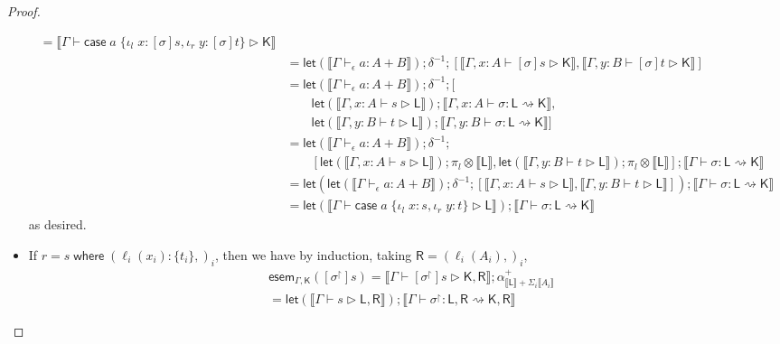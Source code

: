 \documentclass[acmsmall,screen,review]{acmart}
\newcommand{\ms}[1]{\ensuremath{\mathsf{#1}}}
\newcommand{\lto}{:}
\newcommand{\linl}[1]{\iota_l\;{#1}}
\newcommand{\linr}[1]{\iota_r\;{#1}}
\newcommand{\casestmt}[5]{\ms{case}\;#1\;\{\linl{#2} \lto #3, \linr{#4} \lto #5\}}
\newcommand{\where}[2]{#1\;\ms{where}\;#2}
\newcommand{\wbranch}[3]{#1(#2) \lto \{#3\}}
\newcommand{\rupg}[1]{{#1}^\upharpoonright}
\newcommand{\bhyp}[2]{#1 : #2}
\newcommand{\hasty}[4]{#1 \vdash_{#2} #3: {#4}}
\newcommand{\haslb}[3]{#1 \vdash #2 \rhd #3}
\newcommand{\lbsubst}[4]{#1 \vdash #2: #3 \rightsquigarrow #4}
\newcommand{\dnt}[1]{\llbracket{#1}\rrbracket}
\newcommand{\entrymor}[3]{\ms{esem}_{#1, #3}(#2)}
\newcommand{\lmor}[1]{\ms{let}(#1)}
\begin{document}
\begin{proof}
\begin{itemize}[leftmargin=*]
\begin{equation}
\begin{aligned}
          = \dnt{\haslb{\Gamma}{\casestmt{a}{x}{[\sigma]s}{y}{[\sigma]t}}{\ms{K}}} \\
        & = \lmor{\dnt{\hasty{\Gamma}{\epsilon}{a}{A + B}}} ; \delta^{-1}
          ; [\dnt{\haslb{\Gamma, \bhyp{x}{A}}{[\sigma]s}{\ms{K}}}, 
              \dnt{\haslb{\Gamma, \bhyp{y}{B}}{[\sigma]t}{\ms{K}}}] \\
        & = \lmor{\dnt{\hasty{\Gamma}{\epsilon}{a}{A + B}}} ; \delta^{-1} ; [
        \\ & \qquad 
            \lmor{\dnt{\haslb{\Gamma, \bhyp{x}{A}}{s}{\ms{L}}}} 
              ; \dnt{\lbsubst{\Gamma, \bhyp{x}{A}}{\sigma}{\ms{L}}{\ms{K}}},
        \\ & \qquad
            \lmor{\dnt{\haslb{\Gamma, \bhyp{y}{B}}{t}{\ms{L}}}}
              ; \dnt{\lbsubst{\Gamma, \bhyp{y}{B}}{\sigma}{\ms{L}}{\ms{K}}}
          ] \\
        & = \lmor{\dnt{\hasty{\Gamma}{\epsilon}{a}{A + B}}} ; \delta^{-1} ;
        \\ & \qquad [
              \lmor{\dnt{\haslb{\Gamma, \bhyp{x}{A}}{s}{\ms{L}}}} ; \pi_l \otimes \dnt{\ms{L}}, 
              \lmor{\dnt{\haslb{\Gamma, \bhyp{y}{B}}{t}{\ms{L}}}} ; \pi_l \otimes \dnt{\ms{L}}] 
          ; \dnt{\lbsubst{\Gamma}{\sigma}{\ms{L}}{\ms{K}}} \\
        & = \lmor{
            \lmor{\dnt{\hasty{\Gamma}{\epsilon}{a}{A + B}}} 
            ; \delta^{-1} 
            ; [\dnt{\haslb{\Gamma, \bhyp{x}{A}}{s}{\ms{L}}}, 
              \dnt{\haslb{\Gamma, \bhyp{y}{B}}{t}{\ms{L}}}]}
          ; \dnt{\lbsubst{\Gamma}{\sigma}{\ms{L}}{\ms{K}}} \\
        & = \lmor{\dnt{\haslb{\Gamma}{\casestmt{a}{x}{s}{y}{t}}{\ms{L}}}}
          ; \dnt{\lbsubst{\Gamma}{\sigma}{\ms{L}}{\ms{K}}}
      \end{aligned}
    \end{equation}
    as desired.
    \item If $r = \where{s}{(\wbranch{\ell_i}{x_i}{t_i},)_i}$, then we have by induction,
    taking $\ms{R} = (\ell_i(A_i),)_i$,
    \begin{equation}
      \begin{aligned}
        & \entrymor{\Gamma}{[\rupg{\sigma}]s}{\ms{K}} 
          = \dnt{\haslb{\Gamma}{[\rupg{\sigma}]s}{\ms{K}, \ms{R}}}
          ; \alpha^+_{\dnt{\ms{L}} + \Sigma_i \dnt{A_i}} \\
        & = \lmor{\dnt{\haslb{\Gamma}{s}{\ms{L}, \ms{R}}}}
          ; \dnt{\lbsubst{\Gamma}{\rupg{\sigma}}{\ms{L}, \ms{R}}{\ms{K}, \ms{R}}}

\end{aligned}
\end{equation}
\end{itemize}
\end{proof}
\end{document}
